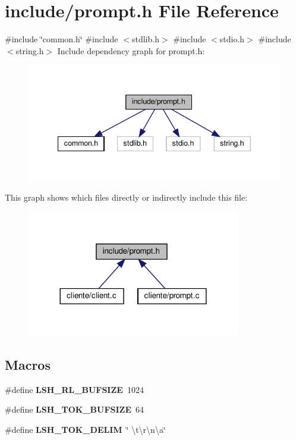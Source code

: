 \section{include/prompt.h File Reference}
\label{prompt_8h}
{\ttfamily \#include \char`\"{}common.\+h\char`\"{}}\newline
{\ttfamily \#include $<$stdlib.\+h$>$}\newline
{\ttfamily \#include $<$stdio.\+h$>$}\newline
{\ttfamily \#include $<$string.\+h$>$}\newline
Include dependency graph for prompt.\+h\+:\nopagebreak
\begin{figure}[H]
\begin{center}
\leavevmode
\includegraphics[width=340pt]{prompt_8h__incl}
\end{center}
\end{figure}
This graph shows which files directly or indirectly include this file\+:\nopagebreak
\begin{figure}[H]
\begin{center}
\leavevmode
\includegraphics[width=264pt]{prompt_8h__dep__incl}
\end{center}
\end{figure}
\subsection*{Macros}
\begin{DoxyCompactItemize}
\item 
\#define \textbf{ L\+S\+H\+\_\+\+R\+L\+\_\+\+B\+U\+F\+S\+I\+ZE}~1024
\item 
\#define \textbf{ L\+S\+H\+\_\+\+T\+O\+K\+\_\+\+B\+U\+F\+S\+I\+ZE}~64
\item 
\#define \textbf{ L\+S\+H\+\_\+\+T\+O\+K\+\_\+\+D\+E\+L\+IM}~\char`\"{} \textbackslash{}t\textbackslash{}r\textbackslash{}n\textbackslash{}a\char`\"{}
\end{DoxyCompactItemize}
